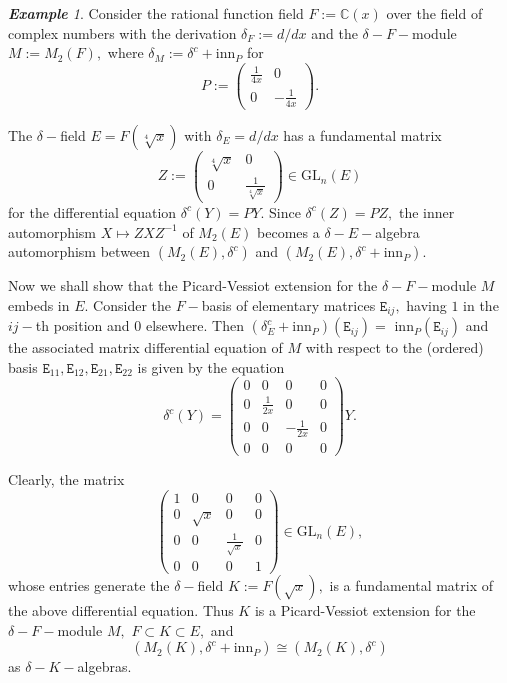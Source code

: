 \documentclass[preprint, 11pt]{amsart}
\theoremstyle{corollary}
\theoremstyle{remark}
\newtheorem{example}{\bf Example}[section]
\theoremstyle{proposition}
\numberwithin{equation}{subsection}
\begin{document}
\begin{example} \label{pvminimality}
	Consider the rational function field $F:=\mathbb C(x)$ over the field of complex numbers with the derivation $\delta_F:=d/dx$ and the $\delta-F-$module $M:=M_2(F),$ where   $\delta_M:=  \delta^c+\mathrm{inn}_P$ for $$P:=\begin{pmatrix}\frac{1}{4x}&0\\ 0& -\frac{1}{4x}\end{pmatrix}.$$ 
	
	The $\delta-$field $E=F(\sqrt[4]{x})$ with $\delta_E=d/dx$ has a fundamental matrix \begin{equation}\label{fundmat-example}Z:=\begin{pmatrix}\sqrt[4]{x}&0\\0&\frac{1}{\sqrt[4]{x}}\end{pmatrix}\in \mathrm{GL}_n(E)\end{equation} 
	for the differential equation $\delta^c(Y)=PY.$ Since $\delta^c(Z)=PZ,$  the inner automorphism $X\mapsto ZXZ^{-1}$ of $M_2(E)$ becomes a  $\delta-E-$algebra automorphism between $(M_2(E), \delta^c)$ and $(M_2(E), \delta^c+\mathrm{inn}_P).$
	
	Now we shall show that the Picard-Vessiot extension for the $\delta-F-$module $M$ embeds in $E.$ Consider the $F-$basis of elementary matrices $\mathtt{E}_{ij},$ having $1$ in the $ij-$th position and $0$ elsewhere. Then $(\delta^c_E+\mathrm{inn}_P)(\mathtt{E}_{ij})=$ $\mathrm{inn}_P(\mathtt{E}_{ij})$ and the associated matrix differential equation of $M$ with respect to the (ordered) basis $\mathtt{E}_{11}, \mathtt{E}_{12}, \mathtt{E}_{21}, \mathtt{E}_{22}$ is given by the equation $$\delta^c(Y)=\begin{pmatrix}0& 0& 0& 0\\ 0& \frac{1}{2x}& 0 &0\\ 0&0&-\frac{1}{2x}&0\\ 0&0&0&0\end{pmatrix}Y.$$
	
	Clearly, the matrix	$$\begin{pmatrix}1& 0& 0& 0\\ 0& \sqrt{x}& 0 &0\\ 0&0&\frac{1}{\sqrt{x}}&0\\ 0&0&0&1\end{pmatrix}\in\mathrm{GL}_n(E),$$ whose entries generate the $\delta-$field $K:=F(\sqrt{x}),$  is a fundamental matrix of the above differential equation.  Thus $K$ is a Picard-Vessiot extension for the $\delta-F-$module $M,$ $F\subset K\subset E,$ and $$(M_2(K),\delta^c+\mathrm{inn}_P )\cong (M_2(K), \delta^c)$$ as $\delta-K-$algebras.
\end{example}
\end{document}
